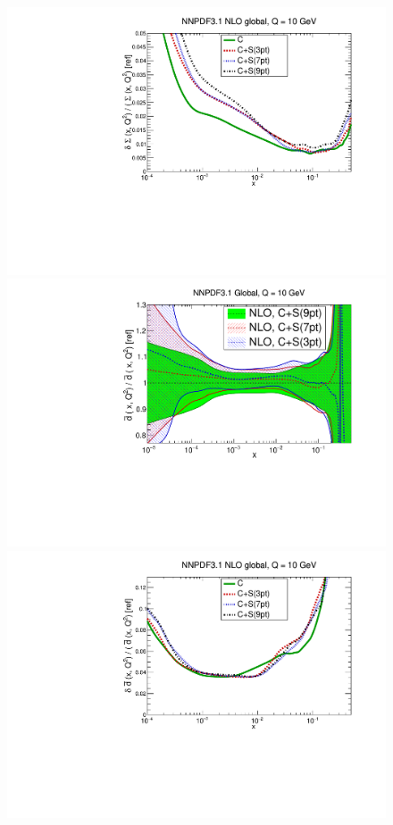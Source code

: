 \begin{figure}[H]
\begin{center}
     \includegraphics[scale=0.35]{mhous/plots/xsinglet-ERR-Global-NLO-CovMatTH-prescriptions-uncertainties.pdf}
    \includegraphics[scale=0.35]{mhous/plots/xdbar-Global-NLO-CovMatTH-prescriptions.pdf}
     \includegraphics[scale=0.35]{mhous/plots/xdbar-ERR-Global-NLO-CovMatTH-prescriptions-uncertainties.pdf}

\end{center}
\end{figure}
